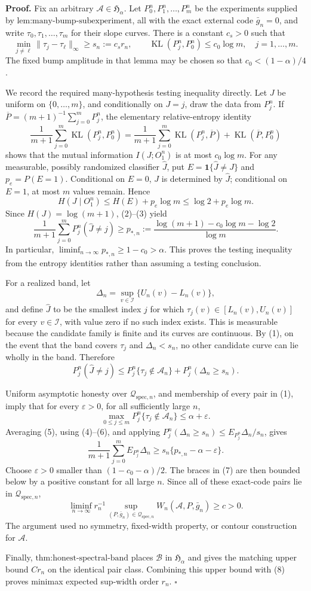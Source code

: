 \textbf{Proof.}
Fix an arbitrary \(\mathcal A\in\mathfrak H_\alpha\).  Let \(P_0^n,P_1^n,\ldots,P_m^n\) be the experiments supplied by \(\text{lem:many-bump-subexperiment}\), all with the exact external code \(\bar g_n=0\), and write \(\tau_0,\tau_1,\ldots,\tau_m\) for their slope curves.  There is a constant \(c_s>0\) such that
\[
 \min_{j\ne\ell}\|\tau_j-\tau_\ell\|_\infty
 \ge s_n:=c_sr_n, \qquad
 \operatorname{KL}(P_j^n,P_0^n)\le c_0\log m,
 \quad j=1,\ldots,m. \tag{1}
\]
The fixed bump amplitude in that lemma may be chosen so that \(c_0<(1-\alpha)/4\).

We record the required many-hypothesis testing inequality directly.  Let \(J\) be uniform on \(\{0,\ldots,m\}\), and conditionally on \(J=j\), draw the data from \(P_j^n\).  If \(\overline P=(m+1)^{-1}\sum_{j=0}^mP_j^n\), the elementary relative-entropy identity
\[
 \frac1{m+1}\sum_{j=0}^m\operatorname{KL}(P_j^n,P_0^n)
 =\frac1{m+1}\sum_{j=0}^m\operatorname{KL}(P_j^n,\overline P)
 +\operatorname{KL}(\overline P,P_0^n) \tag{2}
\]
shows that the mutual information \(I(J;O_1^n)\) is at most \(c_0\log m\).  For any measurable, possibly randomized classifier \(\widehat J\), put \(E=\mathbf 1\{\widehat J\ne J\}\) and \(p_e=P(E=1)\).  Conditional on \(E=0\), \(J\) is determined by \(\widehat J\); conditional on \(E=1\), at most \(m\) values remain.  Hence
\[
 H(J\mid O_1^n)
 \le H(E)+p_e\log m
 \le\log2+p_e\log m. \tag{3}
\]
Since \(H(J)=\log(m+1)\), (2)--(3) yield
\[
 \frac1{m+1}\sum_{j=0}^mP_j^n(\widehat J\ne j)
 \ge p_{*,n}:=\frac{\log(m+1)-c_0\log m-\log2}{\log m}. \tag{4}
\]
In particular, \(\liminf_{n\to\infty}p_{*,n}\ge1-c_0>\alpha\).  This proves the testing inequality from the entropy identities rather than assuming a testing conclusion.

For a realized band, let
\[
 \Delta_n=\sup_{v\in\mathcal I}\{U_n(v)-L_n(v)\},
\]
and define \(\widehat J\) to be the smallest index \(j\) for which \(\tau_j(v)\in[L_n(v),U_n(v)]\) for every \(v\in\mathcal I\), with value zero if no such index exists.  This is measurable because the candidate family is finite and its curves are continuous.  By (1), on the event that the band covers \(\tau_j\) and \(\Delta_n<s_n\), no other candidate curve can lie wholly in the band.  Therefore
\[
 P_j^n(\widehat J\ne j)
 \le P_j^n\{\tau_j\notin\mathcal A_n\}
 +P_j^n(\Delta_n\ge s_n). \tag{5}
\]

Uniform asymptotic honesty over \(\mathcal Q_{\mathrm{spec},n}\), and membership of every pair in (1), imply that for every \(\varepsilon>0\), for all sufficiently large \(n\),
\[
 \max_{0\le j\le m}P_j^n\{\tau_j\notin\mathcal A_n\}
 \le\alpha+\varepsilon. \tag{6}
\]
Averaging (5), using (4)--(6), and applying
\(P_j^n(\Delta_n\ge s_n)\le E_{P_j^n}\Delta_n/s_n\), gives
\[
 \frac1{m+1}\sum_{j=0}^mE_{P_j^n}\Delta_n
 \ge s_n\{p_{*,n}-\alpha-\varepsilon\}. \tag{7}
\]
Choose \(\varepsilon>0\) smaller than \((1-c_0-\alpha)/2\).  The braces in (7) are then bounded below by a positive constant for all large \(n\).  Since all of these exact-code pairs lie in \(\mathcal Q_{\mathrm{spec},n}\),
\[
 \liminf_{n\to\infty}r_n^{-1}
 \sup_{(P,\bar g_n)\in\mathcal Q_{\mathrm{spec},n}}
 W_n(\mathcal A,P,\bar g_n)\ge c>0. \tag{8}
\]
The argument used no symmetry, fixed-width property, or contour construction for \(\mathcal A\).

Finally, \(\text{thm:honest-spectral-band}\) places \(\mathcal B\) in \(\mathfrak H_\alpha\) and gives the matching upper bound \(Cr_n\) on the identical pair class.  Combining this upper bound with (8) proves minimax expected sup-width order \(r_n\). \(\square\)